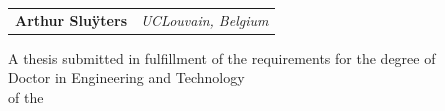 \documentclass[
  10pt, %
  english, %
  singlespacing, %
]{MastersDoctoralThesis} %
\begin{document}
\begin{titlepage}
  \newlength{\oldparindent}%
  \setlength{\oldparindent}{\parindent}%
  \setlength{\parindent}{0em}%
  
  \begin{center}
    \huge \bfseries \color{black} \ttitle
  \end{center}
  \vspace{-10pt}
  \begin{center}
    \Large \bfseries \color{customdarkgray} \tstitle
  \end{center}
  
  \vspace{.3cm}

  \begin{center}
    \large
    \begin{tabular}{ll}
      \textbf{Arthur Sluÿters} & \textit{UCLouvain, Belgium} \\
    \end{tabular}  
  \end{center}

  \vspace{1.4cm}
    
  \begin{center}
    \small A thesis submitted in fulfillment of the requirements for the degree of\\[0.2cm] {\large Doctor in Engineering and Technology}\\[0.2cm] of the\\[0.2cm] {\large \univname} 
  \end{center}

  \vspace{1.4cm}
   

\end{titlepage}
\end{document}
